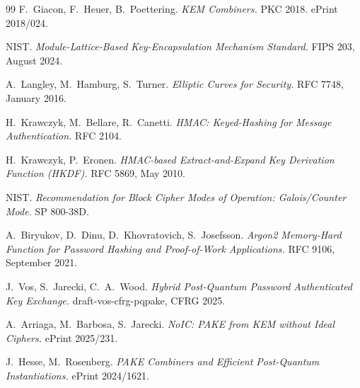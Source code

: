 \documentclass[11pt,a4paper]{article}
\begin{document}
\begin{thebibliography}{99}
 F.~Giacon, F.~Heuer, B.~Poettering.
\textit{KEM Combiners.} PKC 2018. ePrint 2018/024.

 NIST. \textit{Module-Lattice-Based
Key-Encapsulation Mechanism Standard.} FIPS 203, August 2024.

 A.~Langley, M.~Hamburg, S.~Turner.
\textit{Elliptic Curves for Security.} RFC 7748, January 2016.

 H.~Krawczyk, M.~Bellare, R.~Canetti.
\textit{HMAC: Keyed-Hashing for Message Authentication.} RFC 2104.

 H.~Krawczyk, P.~Eronen.
\textit{HMAC-based Extract-and-Expand Key Derivation Function (HKDF).}
RFC 5869, May 2010.

 NIST. \textit{Recommendation for Block Cipher
Modes of Operation: Galois/Counter Mode.} SP 800-38D.

 A.~Biryukov, D.~Dinu, D.~Khovratovich, S.~Josefsson.
\textit{Argon2 Memory-Hard Function for Password Hashing and
Proof-of-Work Applications.} RFC 9106, September 2021.

 J.~Vos, S.~Jarecki, C.~A.~Wood.
\textit{Hybrid Post-Quantum Password Authenticated Key Exchange.}
draft-vos-cfrg-pqpake, CFRG 2025.

 A.~Arriaga, M.~Barbosa, S.~Jarecki.
\textit{NoIC: PAKE from KEM without Ideal Ciphers.}
ePrint 2025/231.

 J.~Hesse, M.~Rosenberg.
\textit{PAKE Combiners and Efficient Post-Quantum Instantiations.}
ePrint 2024/1621.
\end{thebibliography}
\end{document}
